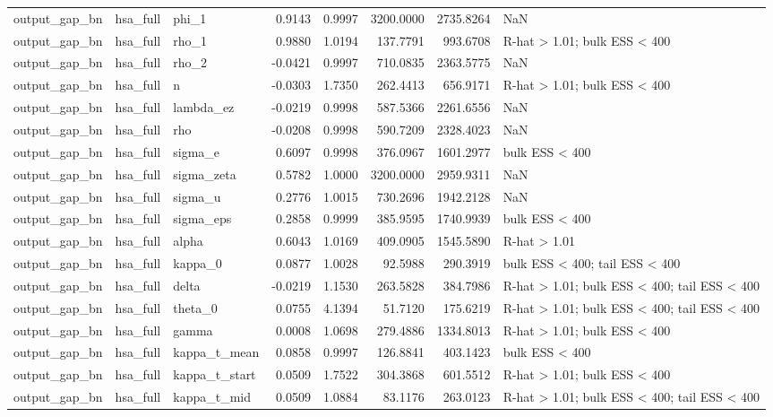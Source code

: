 \begin{tabular}{lllrrrrl}
output\_gap\_bn & hsa\_full & phi\_1 & 0.9143 & 0.9997 & 3200.0000 & 2735.8264 & NaN \\
output\_gap\_bn & hsa\_full & rho\_1 & 0.9880 & 1.0194 & 137.7791 & 993.6708 & R-hat > 1.01; bulk ESS < 400 \\
output\_gap\_bn & hsa\_full & rho\_2 & -0.0421 & 0.9997 & 710.0835 & 2363.5775 & NaN \\
output\_gap\_bn & hsa\_full & n & -0.0303 & 1.7350 & 262.4413 & 656.9171 & R-hat > 1.01; bulk ESS < 400 \\
output\_gap\_bn & hsa\_full & lambda\_ez & -0.0219 & 0.9998 & 587.5366 & 2261.6556 & NaN \\
output\_gap\_bn & hsa\_full & rho & -0.0208 & 0.9998 & 590.7209 & 2328.4023 & NaN \\
output\_gap\_bn & hsa\_full & sigma\_e & 0.6097 & 0.9998 & 376.0967 & 1601.2977 & bulk ESS < 400 \\
output\_gap\_bn & hsa\_full & sigma\_zeta & 0.5782 & 1.0000 & 3200.0000 & 2959.9311 & NaN \\
output\_gap\_bn & hsa\_full & sigma\_u & 0.2776 & 1.0015 & 730.2696 & 1942.2128 & NaN \\
output\_gap\_bn & hsa\_full & sigma\_eps & 0.2858 & 0.9999 & 385.9595 & 1740.9939 & bulk ESS < 400 \\
output\_gap\_bn & hsa\_full & alpha & 0.6043 & 1.0169 & 409.0905 & 1545.5890 & R-hat > 1.01 \\
output\_gap\_bn & hsa\_full & kappa\_0 & 0.0877 & 1.0028 & 92.5988 & 290.3919 & bulk ESS < 400; tail ESS < 400 \\
output\_gap\_bn & hsa\_full & delta & -0.0219 & 1.1530 & 263.5828 & 384.7986 & R-hat > 1.01; bulk ESS < 400; tail ESS < 400 \\
output\_gap\_bn & hsa\_full & theta\_0 & 0.0755 & 4.1394 & 51.7120 & 175.6219 & R-hat > 1.01; bulk ESS < 400; tail ESS < 400 \\
output\_gap\_bn & hsa\_full & gamma & 0.0008 & 1.0698 & 279.4886 & 1334.8013 & R-hat > 1.01; bulk ESS < 400 \\
output\_gap\_bn & hsa\_full & kappa\_t\_mean & 0.0858 & 0.9997 & 126.8841 & 403.1423 & bulk ESS < 400 \\
output\_gap\_bn & hsa\_full & kappa\_t\_start & 0.0509 & 1.7522 & 304.3868 & 601.5512 & R-hat > 1.01; bulk ESS < 400 \\
output\_gap\_bn & hsa\_full & kappa\_t\_mid & 0.0509 & 1.0884 & 83.1176 & 263.0123 & R-hat > 1.01; bulk ESS < 400; tail ESS < 400 \\

\end{tabular}
